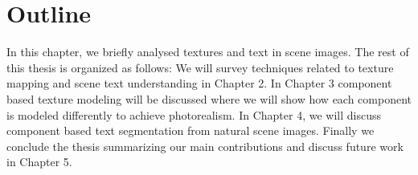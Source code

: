 \section{Outline}


In this chapter, we briefly analysed textures and text in scene images. 
The rest of this thesis is organized as follows: 
We will survey techniques related to texture mapping and scene text understanding in Chapter 2. In Chapter 3
component based texture modeling will be discussed where we will show how each component is
modeled differently to achieve photorealism.
In Chapter 4, we will discuss component based text segmentation from natural scene images. Finally we 
conclude the thesis summarizing our main contributions and discuss future work in Chapter 5.





